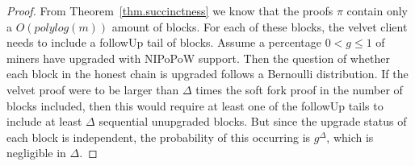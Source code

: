 \begin{proof}
    From Theorem~\ref{thm.succinctness} we know that the proofs $\pi$ contain
    only a $O(polylog(m))$ amount of blocks. For each of these blocks, the
    velvet client needs to include a followUp tail of blocks. Assume a
    percentage $0 < g \leq 1$ of miners have upgraded with NIPoPoW support.
    Then the question of whether each block in the honest chain is upgraded
    follows a Bernoulli distribution. If the velvet proof were to be larger
    than $\Delta$ times the soft fork proof in the number of blocks included,
    then this would require at least one of the followUp tails to include at
    least $\Delta$ sequential unupgraded blocks. But since the upgrade status
    of each block is independent, the probability of this occurring is
    $g^\Delta$, which is negligible in $\Delta$.
\end{proof}
